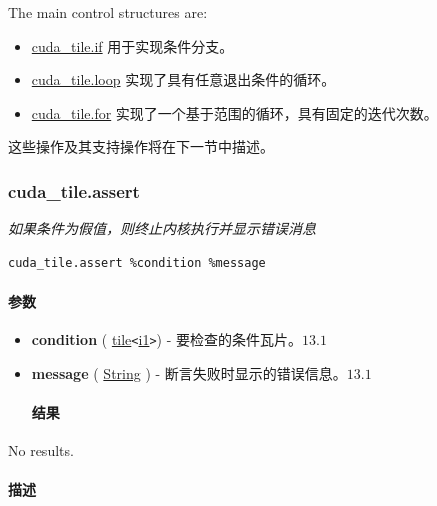 \documentclass{article}
\begin{document}
The main control structures are:


\begin{itemize}
\item \href{https://docs.nvidia.com/cuda/tile-ir/latest/sections/operations.html#op-cuda-tile-if}{cuda\_tile.if} 用于实现条件分支。
\item \href{https://docs.nvidia.com/cuda/tile-ir/latest/sections/operations.html#op-cuda-tile-loop}{cuda\_tile.loop} 实现了具有任意退出条件的循环。
\item \href{https://docs.nvidia.com/cuda/tile-ir/latest/sections/operations.html#op-cuda-tile-for}{cuda\_tile.for} 实现了一个基于范围的循环，具有固定的迭代次数。

\end{itemize}
这些操作及其支持操作将在下一节中描述。


\subsubsection{cuda\_tile.assert}

\textit{如果条件为假值，则终止内核执行并显示错误消息}


\begin{lstlisting}
cuda_tile.assert %condition %message
\end{lstlisting}

\paragraph{参数}

\begin{itemize}
\item \textbf{condition} ( \href{https://docs.nvidia.com/cuda/tile-ir/latest/sections/types.html#type-tile}{tile}\texttt{<}\href{https://docs.nvidia.com/cuda/tile-ir/latest/sections/types.html#subsection-element-types}{i1}\texttt{>}) - 要检查的条件瓦片。$\boxed{13.1}$
\item \textbf{message} ( \href{https://docs.nvidia.com/cuda/tile-ir/latest/sections/operations.html#type-string}{String} ) - 断言失败时显示的错误信息。$\boxed{13.1}$


\paragraph{结果}

\end{itemize}
No results.



\paragraph{描述}
\end{document}

